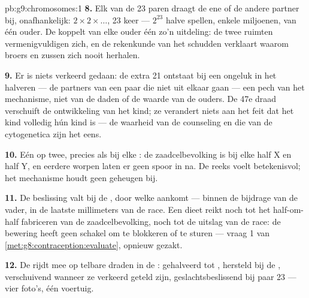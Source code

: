 \begin{solution}{pb:g9:chromosomes:1}
\textbf{8.} Elk van de 23 paren draagt de ene of de andere
partner bij, onafhankelijk: $2 \times 2 \times \dots$, 23 keer
--- $2^{23}$ halve spellen, enkele miljoenen, van één ouder. De
 koppelt van elke ouder één zo'n uitdeling: de twee
ruimten vermenigvuldigen zich, en de rekenkunde van het schudden
verklaart waarom broers en zussen zich nooit herhalen.

\textbf{9.} Er is niets verkeerd gedaan: de extra 21 ontstaat bij
een ongeluk in het halveren --- de partners van een paar die niet
uit elkaar gaan --- een pech van het mechanisme, niet van de
daden of de waarde van de ouders. De 47e draad verschuift de
ontwikkeling van het kind; ze verandert niets aan het feit dat
het kind volledig hún kind is --- de waarheid van de counseling
en die van de cytogenetica zijn het eens.

\textbf{10.} Eén op twee, precies als bij elke : de
zaadcelbevolking is bij elke  half X en half Y, en
eerdere worpen laten er geen spoor in na. De reeks voelt
betekenisvol; het mechanisme houdt geen geheugen bij.

\textbf{11.} De beslissing valt bij de , door welke
 aankomt --- binnen de bijdrage van de vader, in de
laatste millimeters van de race. Een dieet reikt noch tot het
half-om-half fabriceren van de zaadcelbevolking, noch tot de
uitslag van de race: de bewering heeft geen schakel om te
blokkeren of te sturen --- vraag 1 van
\cref{met:g8:contraception:evaluate}, opnieuw gezakt.

\textbf{12.} De  rijdt mee op telbare draden in de
: gehalveerd tot , hersteld bij de
,  verschuivend wanneer ze verkeerd geteld
zijn, geslachtsbeslissend bij paar 23 --- vier foto's, één
voertuig.
\end{solution}
